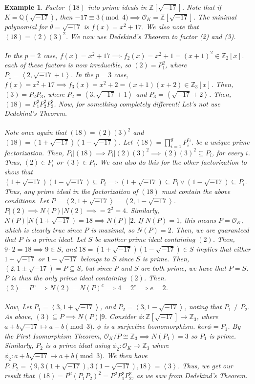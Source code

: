 \documentclass{article}
\newcommand{\la}{\left\langle}
\newcommand{\ra}{\right\rangle}
\newcommand{\air}{\mathcal{O}_K}
\newcommand{\Q}{\mathbb{Q}}
\newcommand{\Z}{\mathbb{Z}}
\newtheorem{example}{Example}[subsection]
\begin{document}
\begin{example}
Factor $(18)$ into prime ideals in $\Z[\sqrt{-17}]$. Note that if $K=\Q(\sqrt{-17})$, then $-17\equiv 3\pmod{4}\implies \air = \Z[\sqrt{-17}]$. The minimal polynomial for $\theta=\sqrt{-17}$ is $f(x)=x^2+17$. We also note that $(18)=(2)(3)^2$. We now use Dedekind's Theorem to factor (2) and (3).\\
\\
In the $p=2$ case, $f(x)=x^2+17\implies f_2(x)=x^2+1=(x+1)^2\in\Z_2[x]$. each of these factors is now irreducible, so $(2)=P_1^2$, where $P_1=\la 2,\sqrt{-17}+1\ra$. In the $p=3$ case, $f(x)=x^2+17\implies f_3(x)=x^2+2=(x+1)(x+2)\in\Z_3[x]$. Then, $(3)=P_2P_3$, where $P_2=\la 3, \sqrt{-17}+1\ra$ and $P_3=\la \sqrt{-17}+2\ra$. Then, $(18)=P_1^2P_2^2P_3^2$. Now, for something completely different! Let's not use Dedekind's Theorem.\\
\\
Note once again that $(18)=(2)(3)^2$ and $(18)=(1+\sqrt{-17})(1-\sqrt{-17})$. Let $\la 18\ra = \displaystyle\prod_{i=1}^g P_i^{e_i}$. be a unique prime factorization. Then, $P_i|(18)\implies P_i|(2)(3)^2\implies (2)(3)^2\subseteq P_i$, for every $i$. Thus, $(2)\in P_i$ or $(3)\in P_i$. We can also do this for the other factorization to show that $(1+\sqrt{-17})(1-\sqrt{-17})\subseteq P_i\implies 
(1+\sqrt{-17})\subseteq P_i \vee (1-\sqrt{-17})\subseteq P_i$. Thus, any prime ideal in the factorization of $(18)$ must contain the above conditions. Let $P=\la 2,1+\sqrt{-17}\ra=\la 2,1-\sqrt{-17}\ra$. $P|(2)\implies N(P)|N(2)\implies = 2^2=4.$ Similarly, $N(P)|N(1+\sqrt{-17})=18\implies N(P)|2$. If $N(P)=1$, this means $P=\air$, which is clearly true since $P$ is maximal, so $N(P)=2$. Then, we are guaranteed that $P$ is a prime ideal. Let $S$ be another prime ideal containing $(2)$. Then, $9\cdot 2 = 18\implies 9\in S$, and $18=(1+\sqrt{-17})(1-\sqrt{-17})\in S$ implies that either $1+\sqrt{-17}$ or $1-\sqrt{-17}$ belongs to $S$ since $S$ is prime. Then, $(2,1\pm\sqrt{-17})=P\subseteq S$, but since $P$ and $S$ are both prime, we have that $P=S$. $P$ is thus the only prime ideal containing $(2)$. Then. $(2)=P^e\implies N(2)=N(P)^e\implies 4=2^e\implies e=2$.\\
\\
Now, Let $P_1=\la 3,1+\sqrt{-17}\ra$, and $P_2=\la 3,1-\sqrt{-17}\ra$, noting that $P_1\neq P_2$. As above, $(3)\subseteq P\implies N(P)|9$. Consider $\phi:\Z[\sqrt{-17}]\rightarrow\Z_3$, where $a+b\sqrt{-17}\mapsto a-b\pmod{3}$. $\phi$ is a surjective homomorphism. $ker\phi = P_1$. By the First Isomorphism Theorem, $\air/P\cong \Z_3\implies N(P_1)=3$ so $P_1$ is prime. Similarly, $P_2$ is a prime ideal using $\phi_2:\air\to\Z_3$ where $\phi_2:a+b\sqrt{-17}\mapsto a+b\pmod{3}$. We then have $P_1P_2=\la 9, 3(1+\sqrt{-17}), 3(1-\sqrt{-17}), 18\ra=\la 3\ra$. Thus, we get our result that $(18)=P^2(P_1P_2)^2=P^2P_1^2P_2^2$, as we saw from Dedekind's Theorem.
\end{example}
\end{document}
